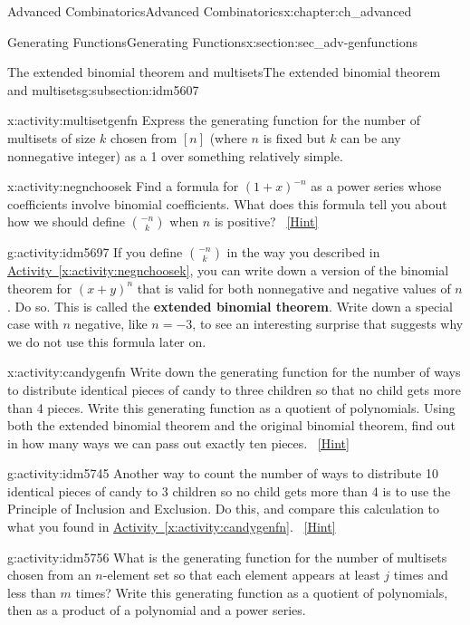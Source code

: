 \documentclass[oneside,10pt,]{book}
\newcommand{\terminology}[1]{\textbf{#1}}
\numberwithin{equation}{chapter}
\begin{document}
\begin{chapterptx}{Advanced Combinatorics}{}{Advanced Combinatorics}{}{}{x:chapter:ch_advanced}
\begin{sectionptx}{Generating Functions}{}{Generating Functions}{}{}{x:section:sec_adv-genfunctions}
\begin{subsectionptx}{The extended binomial theorem and multisets}{}{The extended binomial theorem and multisets}{}{}{g:subsection:idm5607}
\begin{activity}{}{x:activity:multisetgenfn}%
Express the generating function for the number of multisets of size \(k\) chosen from \([n]\) (where \(n\) is fixed but \(k\) can be any nonnegative integer) as a 1 over something relatively simple.%
\end{activity}
\begin{activity}{}{x:activity:negnchoosek}%
Find a formula for \((1+x)^{-n}\) as a power series whose coefficients involve binomial coefficients. What does this formula tell you about how we should define \(\binom{-n}{k}\) when \(n\) is positive?%
\qquad~\hfill{\tiny\hyperlink{g:hint:idm5684-back}{[Hint]}}\end{activity}
\begin{activity}{}{g:activity:idm5697}%
If you define \(\binom{-n}{k}\) in the way you described in \hyperref[x:activity:negnchoosek]{Activity~\ref{x:activity:negnchoosek}}, you can write down a version of the binomial theorem for \((x+y)^n\) that is valid for both nonnegative and negative values of \(n\). Do so. This is called the \terminology{extended binomial theorem}. Write down a special case with \(n\) negative, like \(n=-3\), to see an interesting surprise that suggests why we do not use this formula later on.%
\end{activity}
\begin{activity}{}{x:activity:candygenfn}%
Write down the generating function for the number of ways to distribute identical pieces of candy to three children so that no child gets more than 4 pieces. Write this generating function as a quotient of polynomials. Using both the extended binomial theorem and the original binomial theorem, find out in how many ways we can pass out exactly ten pieces.%
\qquad~\hfill{\tiny\hyperlink{g:hint:idm5729-back}{[Hint]}}\end{activity}
\begin{activity}{}{g:activity:idm5745}%
Another way to count the number of ways to distribute 10 identical pieces of candy to 3 children so no child gets more than 4 is to use the Principle of Inclusion and Exclusion.  Do this, and compare this calculation to what you found in \hyperref[x:activity:candygenfn]{Activity~\ref{x:activity:candygenfn}}.%
\qquad~\hfill{\tiny\hyperlink{g:hint:idm5749-back}{[Hint]}}\end{activity}
\begin{activity}{}{g:activity:idm5756}%
What is the generating function for the number of multisets chosen from an \(n\)-element set so that each element appears at least \(j\) times and less than \(m\) times? Write this generating function as a quotient of polynomials, then as a product of a polynomial and a power series.%

\end{activity}
\end{subsectionptx}
\end{sectionptx}
\end{chapterptx}
\end{document}
